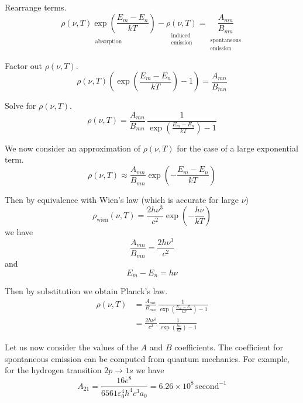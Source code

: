 \documentclass[12pt]{article}
\newcommand\BMN{B_{mn}} %
\newcommand\AMN{A_{mn}} %
\newcommand\RHO{\rho(\nu,T)}
\newcommand\ABSORPTION{\substack{\\[1ex] \text{absorption}}}
\newcommand\INDUCED{\substack{\\[1ex] \text{induced}\\ \text{emission}}}
\newcommand\SPONTANEOUS{\substack{\\[1ex] \text{spontaneous}\\ \text{emission}}}
\begin{document}
\noindent
Rearrange terms.
\begin{equation*}
\underset{\ABSORPTION}{\RHO\exp\left(\frac{E_m-E_n}{kT}\right)}
-\underset{\INDUCED}{\RHO}=\underset{\SPONTANEOUS}{\frac{\AMN}{\BMN}}
\end{equation*}

\noindent
Factor out $\RHO$.
\begin{equation*}
\RHO\left(\exp\left(\frac{E_m-E_n}{kT}\right)-1\right)
=\frac{\AMN}{\BMN}
\end{equation*}

\noindent
Solve for $\RHO$.
\begin{equation*}
\RHO
=\frac{\AMN}{\BMN}\,\frac{1}{\exp\left(\frac{E_m-E_n}{kT}\right)-1}
\end{equation*}

\noindent
We now consider an approximation of $\RHO$ for the case of a large exponential term.
\begin{equation*}
\RHO\approx
\frac{\AMN}{\BMN}\exp\left(-\frac{E_m-E_n}{kT}\right)
\end{equation*}

\noindent
Then by equivalence with Wien's law (which is accurate for large $\nu$)
\begin{equation*}
\rho_\text{wien}(\nu,T)=\frac{2h\nu^3}{c^2}\exp\left(-\frac{h\nu}{kT}\right)
\end{equation*}
we have
\begin{equation*}
\frac{\AMN}{\BMN}=\frac{2h\nu^3}{c^2}
\tag{4}
\end{equation*}
and
\begin{equation*}
E_m-E_n=h\nu
\end{equation*}

\noindent
Then by substitution we obtain Planck's law.
\begin{align*}
\RHO
&=\frac{\AMN}{\BMN}\,\frac{1}{\exp\left(\frac{E_m-E_n}{kT}\right)-1}
\\[1.5ex]
&=\frac{2h\nu^3}{c^2}\,\frac{1}{\exp\left(\frac{h\nu}{kT}\right)-1}
\end{align*}

\noindent
Let us now consider the values of the $A$ and $B$ coefficients.
The coefficient for spontaneous emission can be computed from quantum mechanics.
For example, for the hydrogen transition $2p\rightarrow1s$ we have
\begin{equation*}
A_{21}=\frac{16e^8}{6561\varepsilon_0^4h^4c^3a_0}
=6.26\times10^8\,\text{second}^{-1}
\end{equation*}
\end{document}
